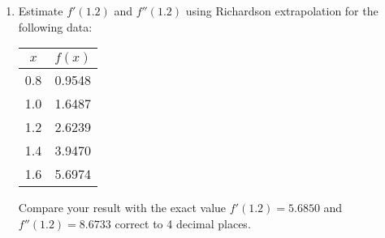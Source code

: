 \documentclass[12pt,class=book,crop=false]{standalone}
\begin{document}
\begin{enumerate}
\begin{enumerate}
              \item Derive three-point forward and backward difference formulae for the first and second derivatives using two-point first derivative formula.\\
                    Use three-point formulae to estimate the values of $ f' (1.4) $, $ f' (1.8) $, $ f''(1.4) $ and $ f''(1.8) $.
              \item Derive five-point central difference formula for $ f' (x_0) $ and $ f''(x_0) $ using three-point central difference formula with Richardson extrapolation.\\
                    Use five-points formulae to estimate the values of $ f' (1.6) $ and $ f''(1.6) $.


                        [The table is constructed for $ f(x)=x \sin x $]
          \end{enumerate}
    \item Estimate $ f' (1.2) $ and $ f''(1.2) $ using Richardson extrapolation for the following data:
          \begin{table}[H]
              \centering
              \begin{tabular}{cS[table-format=1.4]}
                  \toprule
                  $ x $    &\\    &0.9548 \\
                  1.0    &1.6487 \\
                  1.2    &2.6239 \\
                  1.4    & 3.9470 \\
                  1.6    &5.6974 \\\bottomrule
              \end{tabular}
          \end{table}
          Compare your result with the exact value  $ f'(1.2) = 5.6850 $ and $ f''(1.2)=8.6733 $ correct to 4 decimal places.



\end{enumerate}
\end{document}
